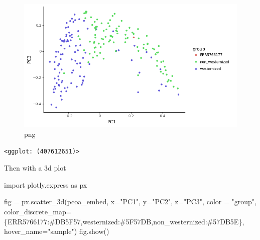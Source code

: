 \documentclass[
  letterpaper,
]{book}
\newenvironment{Shaded}{}{}
\newcommand{\ImportTok}[1]{\textcolor[rgb]{0.01,0.18,0.38}{#1}}
\newcommand{\NormalTok}[1]{\textcolor[rgb]{0.14,0.16,0.18}{#1}}
\newcommand{\OperatorTok}[1]{\textcolor[rgb]{0.14,0.16,0.18}{#1}}
\newcommand{\StringTok}[1]{\textcolor[rgb]{0.01,0.18,0.38}{#1}}
\begin{document}
\begin{figure}

{\centering \includegraphics{assets/images/chapters/taxonomic-profiling/analysis_108_0.png}

}

\caption{png}

\end{figure}

\begin{verbatim}
<ggplot: (407612651)>
\end{verbatim}

Then with a 3d plot

\begin{Shaded}
\begin{Highlighting}[]
\ImportTok{import}\NormalTok{ plotly.express }\ImportTok{as}\NormalTok{ px}

\NormalTok{fig }\OperatorTok{=}\NormalTok{ px.scatter\_3d(pcoa\_embed, x}\OperatorTok{=}\StringTok{"PC1"}\NormalTok{, y}\OperatorTok{=}\StringTok{"PC2"}\NormalTok{, z}\OperatorTok{=}\StringTok{"PC3"}\NormalTok{,}
\NormalTok{                  color }\OperatorTok{=} \StringTok{"group"}\NormalTok{,}
\NormalTok{                  color\_discrete\_map}\OperatorTok{=}\NormalTok{\{}\StringTok{\textquotesingle{}ERR5766177\textquotesingle{}}\NormalTok{:}\StringTok{\textquotesingle{}\#DB5F57\textquotesingle{}}\NormalTok{,}\StringTok{\textquotesingle{}westernized\textquotesingle{}}\NormalTok{:}\StringTok{\textquotesingle{}\#5F57DB\textquotesingle{}}\NormalTok{,}\StringTok{\textquotesingle{}non\_westernized\textquotesingle{}}\NormalTok{:}\StringTok{\textquotesingle{}\#57DB5E\textquotesingle{}}\NormalTok{\},}
\NormalTok{                  hover\_name}\OperatorTok{=}\StringTok{"sample"}\NormalTok{)}
\NormalTok{fig.show()}
\end{Highlighting}
\end{Shaded}
\end{document}
